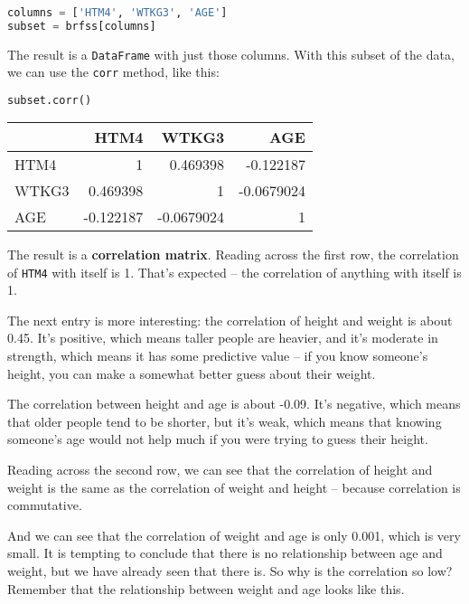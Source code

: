 \begin{lstlisting}[language=Python,style=source]
columns = ['HTM4', 'WTKG3', 'AGE']
subset = brfss[columns]
\end{lstlisting}

The result is a \passthrough{\lstinline!DataFrame!} with just those
columns. With this subset of the data, we can use the
\passthrough{\lstinline!corr!} method, like this:

\begin{lstlisting}[language=Python,style=source]
subset.corr()
\end{lstlisting}

\begin{tabular}{lrrr}
\toprule
 & HTM4 & WTKG3 & AGE \\
\midrule
HTM4 & 1 & 0.469398 & -0.122187 \\
WTKG3 & 0.469398 & 1 & -0.0679024 \\
AGE & -0.122187 & -0.0679024 & 1 \\
\bottomrule
\end{tabular}

The result is a \textbf{correlation matrix}. Reading across the first
row, the correlation of \passthrough{\lstinline!HTM4!} with itself is 1.
That's expected -- the correlation of anything with itself is 1.

The next entry is more interesting: the correlation of height and weight
is about 0.45. It's positive, which means taller people are heavier, and
it's moderate in strength, which means it has some predictive value --
if you know someone's height, you can make a somewhat better guess about
their weight.

The correlation between height and age is about -0.09. It's negative,
which means that older people tend to be shorter, but it's weak, which
means that knowing someone's age would not help much if you were trying
to guess their height.

Reading across the second row, we can see that the correlation of height
and weight is the same as the correlation of weight and height --
because correlation is commutative.

And we can see that the correlation of weight and age is only 0.001,
which is very small. It is tempting to conclude that there is no
relationship between age and weight, but we have already seen that there
is. So why is the correlation so low? Remember that the relationship
between weight and age looks like this.



